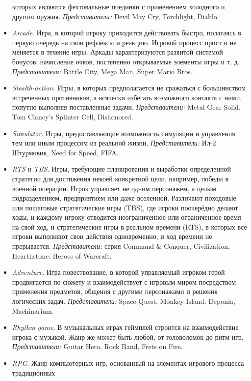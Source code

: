 \begin{itemize}
        которых являются фехтовальные поединки с применением холодного и другого оружия. 
        \emph{Представители:} Devil May Cry, Torchlight, Diablo.
    \item \emph{Arcade}. Игра, в которой игроку приходится действовать быстро, полагаясь в первую очередь 
        на свои рефлексы и реакцию. Игровой процесс прост и не меняется в течение игры. Аркады 
        характеризуются развитой системой бонусов: начисление очков, постепенно открываемые элементы игры 
        и т. д. \emph{Представители:} Battle City, Mega Man, Super Mario Bros.
    \item \emph{Stealth-action}. Игры, в которых предполагается не сражаться с большинством встреченных 
        противников, а всячески избегать возможного контакта с ними, попутно выполняя поставленные задачи. 
        \emph{Представители:} Metal Gear Solid, Tom Clancy's Splinter Cell, Dishonored.
    \item \emph{Simulator}. Игры, предоставляющие возможность симуляции и управления тем или иным процессом 
        из реальной жизни. \emph{Представители:} Ил-2 Штурмовик, Need for Speed, FIFA.
    \item \emph{RTS и TBS}. Игры, требующие планирования и выработки определенной стратегии для достижения 
        некоей конкретной цели, например, победы в военной операции. Игрок управляет не одним персонажем, а 
        целым подразделением, предприятием или даже вселенной. Различают походовые или пошаговые 
        стратегические игры (TBS), где игроки поочерёдно делают ходы, и каждому игроку отводится 
        неограниченное или ограниченное время на свой ход, и стратегические игры в реальном времени (RTS), 
        в которых все игроки выполняют свои действия одновременно, и ход времени не прерывается. 
        \emph{Представители:} серия Command \& Conquer, Civilization, Hearthstone: Heroes of Warcraft.
    \item \emph{Adventure}. Игра-повествование, в которой управляемый игроком герой продвигается по сюжету 
        и взаимодействует с игровым миром посредством применения предметов, общения с другими персонажами 
        и решения логических задач. \emph{Представители:} Space Quest, Monkey Island, Deponia, Machinarium.
    \item \emph{Rhythm game}. В музыкальных играх геймплей строится на взаимодействие игрока с музыкой. 
        Жанр же может быть любой, от головоломок до ритм игр. \emph{Представители:} Guitar Hero, Rock Band, 
        Frets on Fire.
    \item \emph{RPG}. Жанр компьютерных игр, основанный на элементах игрового процесса традиционных 

\end{itemize}
